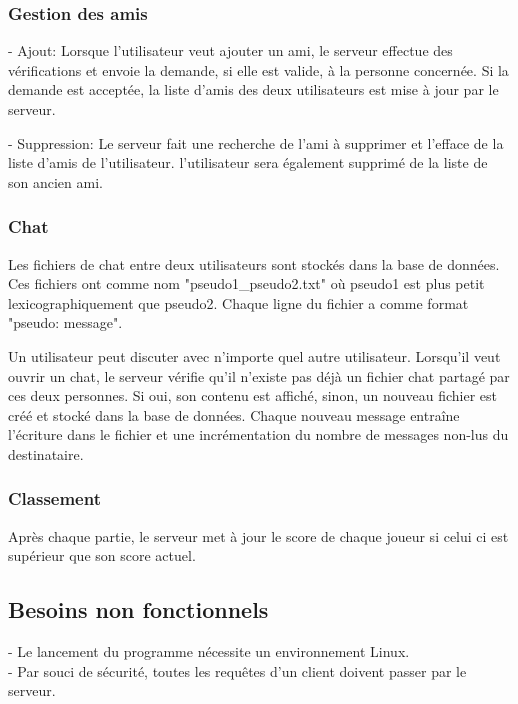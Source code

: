 \documentclass[a4paper,12pt]{article}
\begin{document}
\subsubsection{Gestion des amis}

- Ajout: Lorsque l'utilisateur veut ajouter un ami, le serveur effectue des vérifications et envoie la demande, si elle est valide, à la personne concernée. Si la demande est acceptée, la liste d'amis des deux utilisateurs est mise à jour par le serveur.

- Suppression: Le serveur fait une recherche de l'ami à supprimer et l'efface de la liste d'amis de l'utilisateur. l'utilisateur sera également supprimé de la liste de son ancien ami.

\subsubsection{Chat}

Les fichiers de chat entre deux utilisateurs sont stockés dans la base de données. Ces fichiers ont comme nom "pseudo1\_pseudo2.txt" où pseudo1 est plus petit lexicographiquement que pseudo2. Chaque ligne du fichier a comme format "pseudo: message".

Un utilisateur peut discuter avec n'importe quel autre utilisateur. Lorsqu'il veut ouvrir un chat, le serveur vérifie qu'il n'existe pas déjà un fichier chat partagé par ces deux personnes. Si oui, son contenu est affiché, sinon, un nouveau fichier est créé et stocké dans la base de données. Chaque nouveau message entraîne l'écriture dans le fichier et une incrémentation du nombre de messages non-lus du destinataire.

\subsubsection{Classement}

Après chaque partie, le serveur met à jour le score de chaque joueur si celui ci est supérieur que son score actuel.

\subsection{Besoins non fonctionnels}

- Le lancement du programme nécessite un environnement Linux.\\
- Par souci de sécurité, toutes les requêtes d'un client doivent passer par le serveur.
\end{document}
